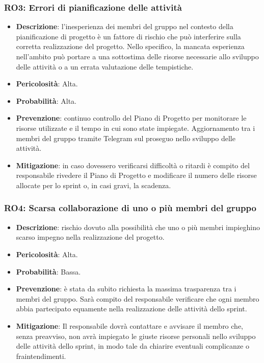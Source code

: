 \subsubsection{RO3: Errori di pianificazione delle attività}
\begin{itemize}
    \item \textbf{Descrizione}: l'inesperienza dei membri del gruppo nel contesto della pianificazione di progetto è un fattore di rischio che può interferire sulla corretta realizzazione del progetto. 
    Nello specifico, la mancata esperienza nell'ambito può portare a una sottostima delle risorse necessarie allo sviluppo delle attività o a un errata valutazione delle tempistiche. 
    \item \textbf{Pericolosità}: Alta.
    \item \textbf{Probabilità}: Alta.
    \item \textbf{Prevenzione}: continuo controllo del Piano di Progetto per monitorare le risorse utilizzate e il tempo in cui sono state impiegate.
    Aggiornamento tra i membri del gruppo tramite Telegram sul proseguo nello sviluppo delle attività.
    \item \textbf{Mitigazione}: in caso dovessero verificarsi difficoltà o ritardi è compito del responsabile rivedere il Piano di Progetto e modificare il numero delle risorse allocate per lo sprint o, in casi gravi, la scadenza.
\end{itemize}

\subsubsection{RO4: Scarsa collaborazione di uno o più membri del gruppo}
\begin{itemize}
    \item \textbf{Descrizione}: rischio dovuto alla possibilità che uno o più membri impieghino scarso impegno nella realizzazione del progetto.
    \item \textbf{Pericolosità}: Alta.
    \item \textbf{Probabilità}: Bassa.
    \item \textbf{Prevenzione}: è stata da subito richiesta la massima trasparenza tra i membri del gruppo.
    Sarà compito del responsabile verificare che ogni membro abbia partecipato equamente nella realizzazione delle attività dello sprint.
    \item \textbf{Mitigazione}: Il responsabile dovrà contattare e avvisare il membro che, senza preavviso, non avrà impiegato le giuste risorse personali nello sviluppo delle attività dello sprint, in modo tale da chiarire eventuali complicanze o fraintendimenti. 
\end{itemize}

